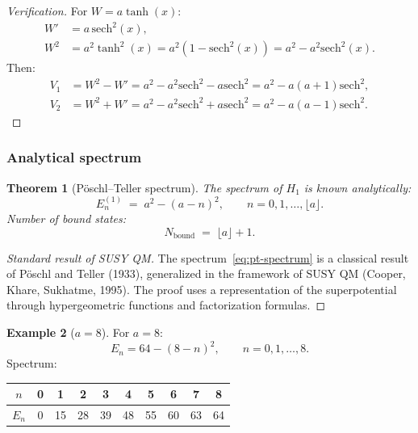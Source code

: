 \documentclass[11pt,a4paper]{article}
\newtheorem{theorem}{Theorem}[section]
\theoremstyle{definition}
\newtheorem{example}[theorem]{Example}
\begin{document}
\begin{proof}[Verification]
For $W = a \tanh(x)$:
\begin{align}
    W' &= a \, \mathrm{sech}^2(x), \\
    W^2 &= a^2 \tanh^2(x) = a^2 (1 - \mathrm{sech}^2(x)) = a^2 - a^2 \mathrm{sech}^2(x).
\end{align}
Then:
\begin{align}
    V_1 &= W^2 - W' = a^2 - a^2 \mathrm{sech}^2 - a \mathrm{sech}^2
    = a^2 - a(a+1) \mathrm{sech}^2, \\
    V_2 &= W^2 + W' = a^2 - a^2 \mathrm{sech}^2 + a \mathrm{sech}^2
    = a^2 - a(a-1) \mathrm{sech}^2.
\end{align}
\end{proof}

\subsubsection{Analytical spectrum}

\begin{theorem}[P\"oschl--Teller spectrum]
\label{thm:pt-spectrum}
The spectrum of $H_1$ is known analytically:
\begin{equation}
    \boxed{
    E_n^{(1)} \;=\; a^2 - (a - n)^2,
    \qquad n = 0, 1, \ldots, \lfloor a \rfloor.
    }
    \label{eq:pt-spectrum}
\end{equation}
Number of bound states:
\begin{equation}
    N_{\text{bound}} \;=\; \lfloor a \rfloor + 1.
    \label{eq:pt-bound-states}
\end{equation}
\end{theorem}

\begin{proof}[Standard result of SUSY QM]
The spectrum~\eqref{eq:pt-spectrum} is a classical result
of P\"oschl and Teller (1933), generalized in the framework of SUSY QM
(Cooper, Khare, Sukhatme, 1995). The proof uses
a representation of the superpotential through hypergeometric
functions and factorization formulas.
\end{proof}

\begin{example}[$a = 8$]
For $a = 8$:
\begin{equation}
    E_n = 64 - (8 - n)^2, \qquad n = 0, 1, \ldots, 8.
\end{equation}
Spectrum:
\begin{center}
\begin{tabular}{c|ccccccccc}
\toprule
$n$ & 0 & 1 & 2 & 3 & 4 & 5 & 6 & 7 & 8 \\
\midrule
$E_n$ & 0 & 15 & 28 & 39 & 48 & 55 & 60 & 63 & 64 \\
\bottomrule
\end{tabular}
\end{center}
\end{example}
\end{document}
